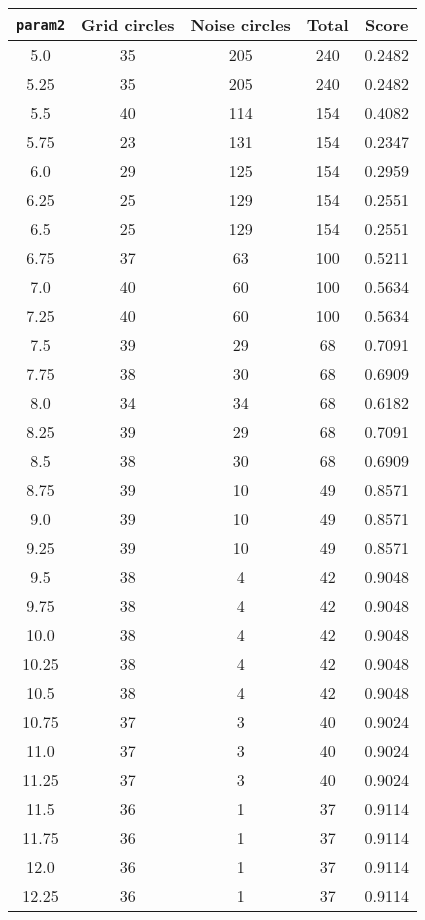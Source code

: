 \documentclass[letterpaper, 12pt]{article}
\begin{document}
\begin{longtable}{|c|c|c|c|c|}
\hline
\textbf{\texttt{param2}} & \textbf{Grid circles} & \textbf{Noise circles} & \textbf{Total} & \textbf{Score} \\
\hline
5.0 & 35 & 205 & 240 & 0.2482 \\
\hline
5.25 & 35 & 205 & 240 & 0.2482 \\
\hline
5.5 & 40 & 114 & 154 & 0.4082 \\
\hline
5.75 & 23 & 131 & 154 & 0.2347 \\
\hline
6.0 & 29 & 125 & 154 & 0.2959 \\
\hline
6.25 & 25 & 129 & 154 & 0.2551 \\
\hline
6.5 & 25 & 129 & 154 & 0.2551 \\
\hline
6.75 & 37 & 63 & 100 & 0.5211 \\
\hline
7.0 & 40 & 60 & 100 & 0.5634 \\
\hline
7.25 & 40 & 60 & 100 & 0.5634 \\
\hline
7.5 & 39 & 29 & 68 & 0.7091 \\
\hline
7.75 & 38 & 30 & 68 & 0.6909 \\
\hline
8.0 & 34 & 34 & 68 & 0.6182 \\
\hline
8.25 & 39 & 29 & 68 & 0.7091 \\
\hline
8.5 & 38 & 30 & 68 & 0.6909 \\
\hline
8.75 & 39 & 10 & 49 & 0.8571 \\
\hline
9.0 & 39 & 10 & 49 & 0.8571 \\
\hline
9.25 & 39 & 10 & 49 & 0.8571 \\
\hline
9.5 & 38 & 4 & 42 & 0.9048 \\
\hline
9.75 & 38 & 4 & 42 & 0.9048 \\
\hline
10.0 & 38 & 4 & 42 & 0.9048 \\
\hline
10.25 & 38 & 4 & 42 & 0.9048 \\
\hline
10.5 & 38 & 4 & 42 & 0.9048 \\
\hline
10.75 & 37 & 3 & 40 & 0.9024 \\
\hline
11.0 & 37 & 3 & 40 & 0.9024 \\
\hline
11.25 & 37 & 3 & 40 & 0.9024 \\
\hline
11.5 & 36 & 1 & 37 & 0.9114 \\
\hline
11.75 & 36 & 1 & 37 & 0.9114 \\
\hline
12.0 & 36 & 1 & 37 & 0.9114 \\
\hline
12.25 & 36 & 1 & 37 & 0.9114 \\
\hline

\end{longtable}
\end{document}
